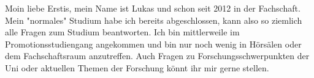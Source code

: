 \begin{multicols*}{2}
{Moin liebe Erstis,
	mein Name ist Lukas und schon seit 2012 in der Fachschaft. Mein "normales" Studium habe ich bereits abgeschlossen, kann also so ziemlich alle Fragen zum Studium beantworten.
	Ich bin mittlerweile im Promotionsstudiengang angekommen und bin nur noch wenig in Hörsälen oder dem Fachschaftsraum anzutreffen.
	Auch Fragen zu Forschungsschwerpunkten der Uni oder aktuellen Themen der Forschung könnt ihr mir gerne stellen.}



\end{multicols*}

